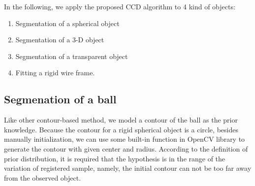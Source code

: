 In the following, we apply the proposed CCD algorithm to 4 kind of
objects:
\begin{enumerate}
\item Segmentation of a spherical object
\item Segmentation of a 3-D object
\item Segmentation of a transparent object
\item Fitting a rigid wire frame.
\end{enumerate}

\subsection{Segmenation of a ball}
\label{sec:sb}
Like other contour-based method, we model a contour of the ball as the
prior knowledge. Because the contour for a rigid spherical object is a
circle, besides manually initialization, we can use some built-in function in
OpenCV library to generate the contour with given center and
radius. According to the definition of prior distribution, it is required
that the hypothesis is in the range of the variation of
registered sample, namely, the initial contour can not be too far away
from the observed object.


